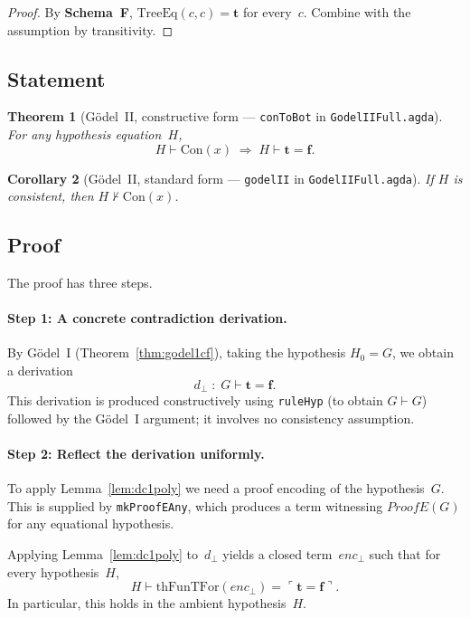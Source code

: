 \documentclass[11pt]{article}
\newtheorem{theorem}{Theorem}
\newtheorem{corollary}[theorem]{Corollary}
\newcommand{\trueT}{\mathbf{t}}
\newcommand{\falseT}{\mathbf{f}}
\newcommand{\SchemaF}{\textbf{Schema~F}}
\newcommand{\code}[1]{\ulcorner #1 \urcorner}
\newcommand{\thFunTFor}{\mathrm{thFunTFor}}
\newcommand{\TreeEq}{\mathrm{TreeEq}}
\begin{document}
\begin{proof}
By \SchemaF{}, $\TreeEq(c, c) = \trueT$ for every~$c$.
Combine with the assumption by transitivity.
\end{proof}

\subsection{Statement}

\begin{theorem}[G\"odel~II, constructive form --- \texttt{conToBot} in \texttt{GodelIIFull.agda}]
\label{thm:godel2cf}
For any hypothesis equation~$H$,
\[
  H \vdash \mathrm{Con}(x) \;\Longrightarrow\;
  H \vdash \trueT = \falseT.
\]
\end{theorem}

\begin{corollary}[G\"odel~II, standard form --- \texttt{godelII} in \texttt{GodelIIFull.agda}]
\label{thm:godel2s}
If $H$ is consistent, then $H \nvdash \mathrm{Con}(x)$.
\end{corollary}

\subsection{Proof}

The proof has three steps.

\paragraph{Step 1: A concrete contradiction derivation.}
By G\"odel~I (Theorem~\ref{thm:godel1cf}), taking the hypothesis
$H_0 = G$, we obtain a derivation
\[
  d_\bot \;:\; G \vdash \trueT = \falseT.
\]
This derivation is produced constructively using \texttt{ruleHyp}
(to obtain $G \vdash G$) followed by the G\"odel~I argument;
it involves no consistency assumption.

\paragraph{Step 2: Reflect the derivation uniformly.}
To apply Lemma~\ref{lem:dc1poly} we need a proof encoding of the
hypothesis~$G$.  This is supplied by \texttt{mkProofEAny}, which
produces a term witnessing $\mathit{ProofE}(G)$ for any equational
hypothesis.

Applying Lemma~\ref{lem:dc1poly} to~$d_\bot$ yields a closed
term~$\mathit{enc}_\bot$ such that for every hypothesis~$H$,
\[
  H \vdash \thFunTFor(\mathit{enc}_\bot) = \code{\trueT = \falseT}.
\]
In particular, this holds in the ambient hypothesis~$H$.
\end{document}
